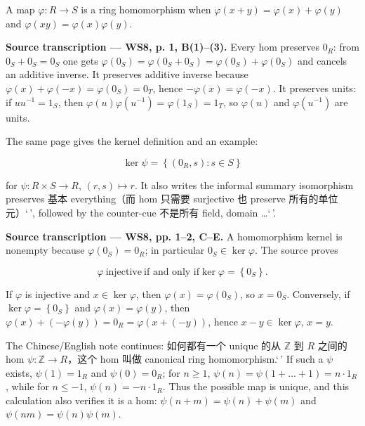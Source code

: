 \begin{definition}{}

A map \(\varphi:R\rightarrow S\) is a ring homomorphism when \(\varphi\left( {x + y} \right) = \varphi(x) + \varphi(y)\) and \(\varphi\left( {xy} \right) = \varphi(x)\varphi(y)\).

\end{definition}

\textbf{Source transcription --- WS8, p. 1, B(1)--(3).} Every hom preserves \(0_{R}\): from \(0_{S} + 0_{S} = 0_{S}\) one gets \(\varphi\left( 0_{S} \right) = \varphi\left( {0_{S} + 0_{S}} \right) = \varphi\left( 0_{S} \right) + \varphi\left( 0_{S} \right)\) and cancels an additive inverse. It preserves additive inverse because \(\varphi(x) + \varphi\left( {- x} \right) = \varphi\left( 0_{S} \right) = 0_{T}\), hence \(- \varphi(x) = \varphi\left( {- x} \right)\). It preserves units: if \(uu^{- 1} = 1_{S}\), then \(\varphi(u)\varphi\left( u^{- 1} \right) = \varphi\left( 1_{S} \right) = 1_{T}\), so \(\varphi(u)\) and \(\varphi\left( u^{- 1} \right)\) are units.

The same page gives the kernel definition and an example:

\[\ker\psi = \left\{ {\left( {0_{R},s} \right):s \in S} \right\}\]

for \(\psi:R \times S\rightarrow R\), \(\left( {r,s} \right)\mapsto r\). It also writes the informal summary isomorphism preserves 基本 everything（而 hom 只需要 surjective 也 preserve 所有的单位元）`\,', followed by the counter-cue 不是所有 field, domain \ldots`\,'.

\textbf{Source transcription --- WS8, pp. 1--2, C--E.} A homomorphism kernel is nonempty because \(\varphi\left( 0_{S} \right) = 0_{R}\); in particular \(0_{S} \in \ker\varphi\). The source proves

\[\varphi\ \text{injective}\ \text{if and only if}\ker\varphi = \left\{ 0_{S} \right\}.\]

If \(\varphi\) is injective and \(x \in \ker\varphi\), then \(\varphi(x) = \varphi\left( 0_{S} \right)\), so \(x = 0_{S}\). Conversely, if \(\ker\varphi = \left\{ 0_{S} \right\}\) and \(\varphi(x) = \varphi(y)\), then \(\varphi(x) + \left( {- \varphi(y)} \right) = 0_{R} = \varphi\left( {x + \left( {- y} \right)} \right)\), hence \(x - y \in \ker\varphi\), \(x = y\).

The Chinese/English note continues: 如何都有一个 unique 的从 \(\mathbb{Z}\) 到 \(R\) 之间的 hom \(\psi:\mathbb{Z}\rightarrow R\)，这个 hom 叫做 canonical ring homomorphism.`\,' If such a \(\psi\) exists, \(\psi(1) = 1_{R}\) and \(\psi(0) = 0_{R}\); for \(n \geq 1\), \(\psi(n) = \psi\left( {1 + \ldots + 1} \right) = n \cdot 1_{R}\), while for \(n \leq - 1\), \(\psi(n) = - n \cdot 1_{R}\). Thus the possible map is unique, and this calculation also verifies it is a hom: \(\psi\left( {n + m} \right) = \psi(n) + \psi(m)\) and \(\psi\left( {nm} \right) = \psi(n)\psi(m)\).

